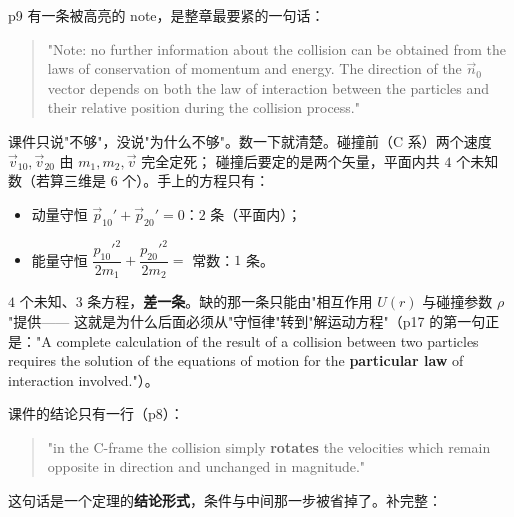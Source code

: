 \documentclass[11pt]{ctexart}
\begin{document}

p9 有一条被高亮的 note，是整章最要紧的一句话：

\begin{quote}
"Note: no further information about the collision can be obtained from the laws of conservation of momentum and energy. The direction of the $\vec n_0$ vector depends on both the law of interaction between the particles and their relative position during the collision process."
\end{quote}

课件只说"不够"，没说"为什么不够"。数一下就清楚。碰撞前（C 系）两个速度 $\vec v_{10},\vec v_{20}$ 由 $m_1,m_2,\vec v$ 完全定死；
碰撞后要定的是两个矢量，平面内共 $4$ 个未知数（若算三维是 $6$ 个）。手上的方程只有：

\begin{itemize}
\item 动量守恒 $\vec p_{10}'+\vec p_{20}'=0$：$2$ 条（平面内）；
\item 能量守恒 $\dfrac{p_{10}'^2}{2m_1}+\dfrac{p_{20}'^2}{2m_2}=$ 常数：$1$ 条。
\end{itemize}

$4$ 个未知、$3$ 条方程，\textbf{差一条}。缺的那一条只能由"相互作用 $U(r)$ 与碰撞参数 $\rho$"提供——
这就是为什么后面必须从"守恒律"转到"解运动方程"（p17 的第一句正是："A complete calculation of the result of a collision between two particles requires the solution of the equations of motion for the \textbf{particular law} of interaction involved."）。



课件的结论只有一行（p8）：

\begin{quote}
"in the C-frame the collision simply \textbf{rotates} the velocities which remain opposite in direction and unchanged in magnitude."
\end{quote}

这句话是一个定理的\textbf{结论形式}，条件与中间那一步被省掉了。补完整：

\end{document}
